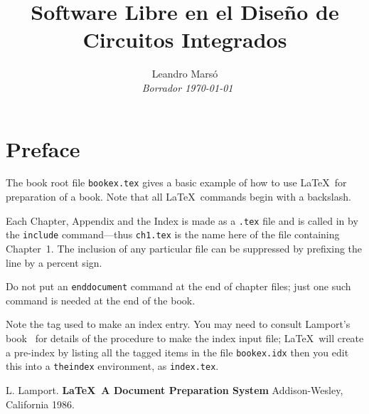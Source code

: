 \documentclass[12pt,leqno]{book}
\title{Software Libre en el Dise\~no de Circuitos Integrados  }
\author{Leandro Mars\'o  \\
{\small\em \copylefg \ Borrador \today }}
\date{ }
\begin{document}
\maketitle
\tableofcontents
\listoffigures
\listoftables
\chapter*{Preface}\normalsize
\pagestyle{plain}
The book root file {\tt bookex.tex} gives a basic example of how to
use \LaTeX \ for preparation of a book. Note that all
\LaTeX \ commands begin with a
backslash.

Each
Chapter, Appendix and the Index is made as a {\tt *.tex} file and is
called in by the {\tt include} command---thus {\tt ch1.tex} is
the name here of the file containing Chapter~1. The inclusion of any
particular file can be suppressed by prefixing the line by a
percent sign.


 Do not put an {\tt end{document}} command at the end of chapter files;
just one such command is needed at the end of the book.

Note the tag used to make an index entry. You may need to consult Lamport's
book~\cite{lamport} for details of the procedure to make the index input
file; \LaTeX \ will create a pre-index by listing all the tagged
items in the file {\tt bookex.idx} then you edit this into
a {\tt theindex} environment, as {\tt index.tex}.





\pagestyle{headings}




\begin{thebibliography}{99}
 L. Lamport. {\bf \LaTeX \ A Document Preparation System}
Addison-Wesley, California 1986.	
\end{thebibliography}


\end{document}
